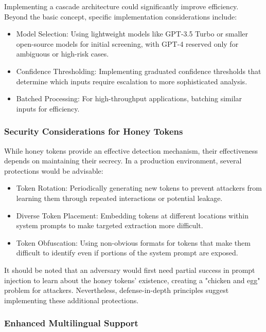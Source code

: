 \documentclass[manuscript,screen,review]{acmart}
\begin{document}
Implementing a cascade architecture could significantly improve efficiency. Beyond the basic concept, specific implementation considerations include:

\begin{itemize}
    \item Model Selection: Using lightweight models like GPT-3.5 Turbo or smaller open-source models for initial screening, with GPT-4 reserved only for ambiguous or high-risk cases.
    
    \item Confidence Thresholding: Implementing graduated confidence thresholds that determine which inputs require escalation to more sophisticated analysis.
    
    \item Batched Processing: For high-throughput applications, batching similar inputs for efficiency.
\end{itemize}

\subsubsection{Security Considerations for Honey Tokens}
While honey tokens provide an effective detection mechanism, their effectiveness depends on maintaining their secrecy. In a production environment, several protections would be advisable:

\begin{itemize}
    \item Token Rotation: Periodically generating new tokens to prevent attackers from learning them through repeated interactions or potential leakage.
    
    \item Diverse Token Placement: Embedding tokens at different locations within system prompts to make targeted extraction more difficult.
    
    \item Token Obfuscation: Using non-obvious formats for tokens that make them difficult to identify even if portions of the system prompt are exposed.
\end{itemize}

It should be noted that an adversary would first need partial success in prompt injection to learn about the honey tokens' existence, creating a "chicken and egg" problem for attackers. Nevertheless, defense-in-depth principles suggest implementing these additional protections.

\subsubsection{Enhanced Multilingual Support}
\end{document}
